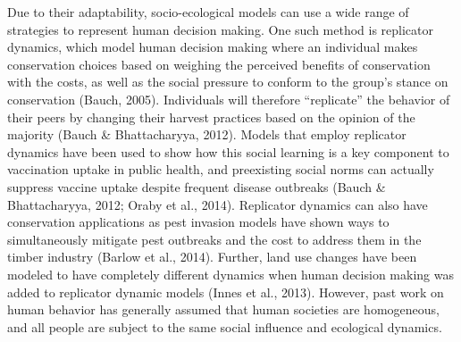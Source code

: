 \documentclass[
  12pt,
]{article}
\begin{document}
Due to their adaptability, socio-ecological models can use a wide range of strategies to represent human decision making. One such method is replicator dynamics, which model human decision making where an individual makes conservation choices based on weighing the perceived benefits of conservation with the costs, as well as the social pressure to conform to the group's stance on conservation (Bauch, 2005). Individuals will therefore ``replicate'' the behavior of their peers by changing their harvest practices based on the opinion of the majority (Bauch \& Bhattacharyya, 2012). Models that employ replicator dynamics have been used to show how this social learning is a key component to vaccination uptake in public health, and preexisting social norms can actually suppress vaccine uptake despite frequent disease outbreaks (Bauch \& Bhattacharyya, 2012; Oraby et al., 2014). Replicator dynamics can also have conservation applications as pest invasion models have shown ways to simultaneously mitigate pest outbreaks and the cost to address them in the timber industry (Barlow et al., 2014). Further, land use changes have been modeled to have completely different dynamics when human decision making was added to replicator dynamic models (Innes et al., 2013). However, past work on human behavior has generally assumed that human societies are homogeneous, and all people are subject to the same social influence and ecological dynamics.
\end{document}
